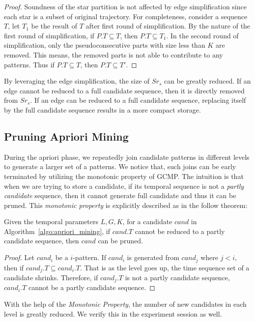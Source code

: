 \begin{proof}
Soundness of the star partition is not affected by edge simplification since each star is a subset of original trajectory. For completeness, consider a sequence $T$, let $T_1$ be the result of $T$ after first round of simplification. By the nature of the first round of simplification, if $P.T \subseteq T$, then $P.T \subseteq T_1$. In the second round of simplification, only the pseudoconsecutive parts with size less than $K$ are removed. This means, the removed parts is not able to contribute to any patterns. Thus if $P.T \subseteq T$, then $P.T \subseteq T'$. 
\end{proof}
By leveraging the edge simplification, the size of $Sr_s$ can be greatly reduced. If
an edge cannot be reduced to a full candidate sequence, then it is directly removed from $Sr_s$.
If an edge can be reduced to a full candidate sequence, replacing itself by the full candidate sequence results in a more compact storage.

\subsection{Pruning Apriori Mining}
During the apriori phase, we repeatedly join candidate patterns in different levels to generate a larger set
of a patterns. We notice that, such joins can be early terminated 
by utilizing the monotonic property of GCMP. The intuition is that when we are trying to store a candidate, if its
temporal sequence is not a \emph{partly candidate} sequence, then it cannot generate full candidate and thus it
can be pruned. This \emph{monotonic property} 
is explicitly described as in the follow theorem:

\begin{theorem}
Given the temporal parameters $L,G,K$, for a candidate $cand$ in Algorithm~\ref{algo:apriori_mining},
if $cand.T$ cannot be reduced to a partly candidate sequence, then $cand$ can be pruned.
\end{theorem}
\begin{proof}
Let $cand_i$ be a $i$-pattern. If $cand_i$ is generated from $cand_j$ where $j < i$, then if $cand_j.T \subseteq cand_i.T$. That is as the level goes up, the time sequence set of a candidate shrinks. Therefore, if $cand_j.T$ is not a partly candidate sequence, $cand_i.T$ cannot be a partly candidate sequence.
\end{proof}

With the help of the \emph{Monotonic Property}, the number of new candidates in each level is greatly reduced. We verify this in the experiment session as well.